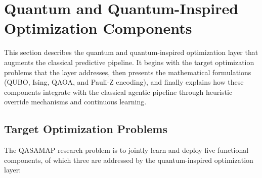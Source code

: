 \section{Quantum and Quantum-Inspired Optimization Components}

This section describes the quantum and quantum-inspired optimization layer that augments the classical predictive pipeline. It begins with the target optimization problems that the layer addresses, then presents the mathematical formulations (QUBO, Ising, QAOA, and Pauli-Z encoding), and finally explains how these components integrate with the classical agentic pipeline through heuristic override mechanisms and continuous learning.

\subsection{Target Optimization Problems}

The QASAMAP research problem is to jointly learn and deploy five functional components, of which three are addressed by the quantum-inspired optimization layer:

